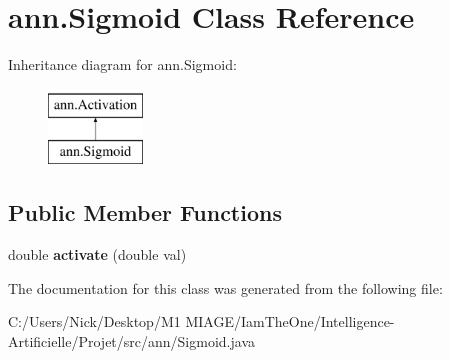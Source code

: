 \hypertarget{classann_1_1_sigmoid}{}\section{ann.\+Sigmoid Class Reference}
\label{classann_1_1_sigmoid}
Inheritance diagram for ann.\+Sigmoid\+:\begin{figure}[H]
\begin{center}
\leavevmode
\includegraphics[height=2.000000cm]{classann_1_1_sigmoid}
\end{center}
\end{figure}
\subsection*{Public Member Functions}
\begin{DoxyCompactItemize}
\item 
\mbox{\label{classann_1_1_sigmoid_a494474439cd325dce73298bebf90d196}} 
double {\bfseries activate} (double val)
\end{DoxyCompactItemize}


The documentation for this class was generated from the following file\+:\begin{DoxyCompactItemize}
\item 
C\+:/\+Users/\+Nick/\+Desktop/\+M1 M\+I\+A\+G\+E/\+Iam\+The\+One/\+Intelligence-\/\+Artificielle/\+Projet/src/ann/Sigmoid.\+java\end{DoxyCompactItemize}
